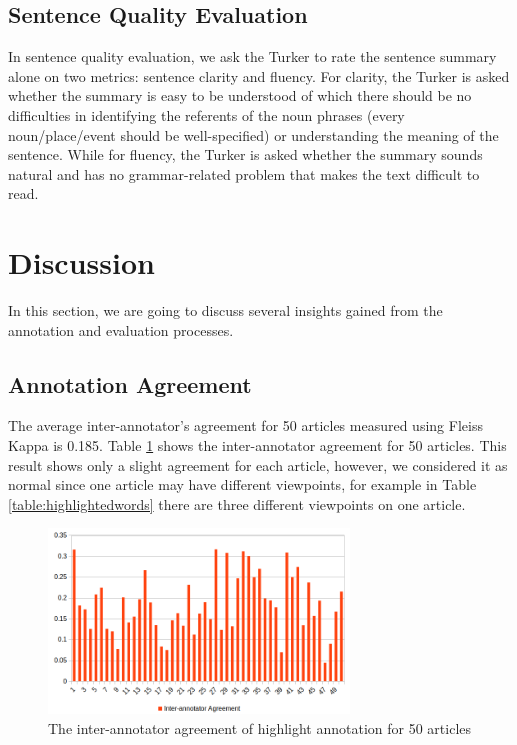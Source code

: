 \documentclass[11pt,a4paper]{article}
\begin{document}
\subsection{Sentence Quality Evaluation}
In sentence quality evaluation, we ask the Turker to rate the sentence summary alone on two metrics: sentence clarity and fluency. For clarity, the Turker is asked whether the summary is easy to be understood of which there should be no difficulties in identifying the referents of the noun phrases (every noun/place/event should be well-specified) or understanding the meaning of the sentence. While for fluency, the Turker is asked whether the summary sounds natural and has no grammar-related problem that makes the text difficult to read.
 
\section{Discussion}
In this section, we are going to discuss several insights gained from the annotation and evaluation processes.

\subsection{Annotation Agreement}
The average inter-annotator's agreement for 50 articles measured using Fleiss Kappa \citep{Josep1971} is 0.185. Table \ref{image:interannotator} shows the inter-annotator agreement for 50 articles. This result shows only a slight agreement for each article, however, we considered it as normal since one article may have different viewpoints, for example in Table \ref{table:highlightedwords} there are three different viewpoints on one article.

\begin{figure}[h!]
  \includegraphics[width=8cm]{annotator}
  \caption{The inter-annotator agreement of highlight annotation for 50 articles}
  \label{image:interannotator}
\end{figure}
\end{document}
